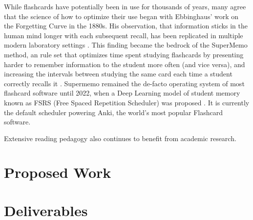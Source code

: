\documentclass[
	letterpaper, %
]{jdf}
\begin{document}
While flashcards have potentially been in use for thousands of years, many agree that the science of how to optimize their use began with Ebbinghaus' work on the Forgetting Curve in the 1880s. His observation, that information sticks in the human mind longer with each subsequent recall, has been replicated in multiple modern laboratory settings \cite{Murre2015ReplicationAA}. This finding became the bedrock of the SuperMemo method, an rule set that optimizes time spent studying flashcards by presenting harder to remember information to the student more often (and vice versa), and increasing the intervals between studying the same card each time a student correctly recalls it \cite{SuperMemo_Method_2023}. Supermemo remained the de-facto operating system of most flashcard software until 2022, when a Deep Learning model of student memory known as FSRS (Free Spaced Repetition Scheduler) was proposed \cite{shortestpathrepetitionscheduling}. It is currently the default scheduler powering Anki, the world's most popular Flashcard software.

Extensive reading pedagogy also continues to benefit from academic research.

\section{Proposed Work}


\section{Deliverables}
\end{document}
